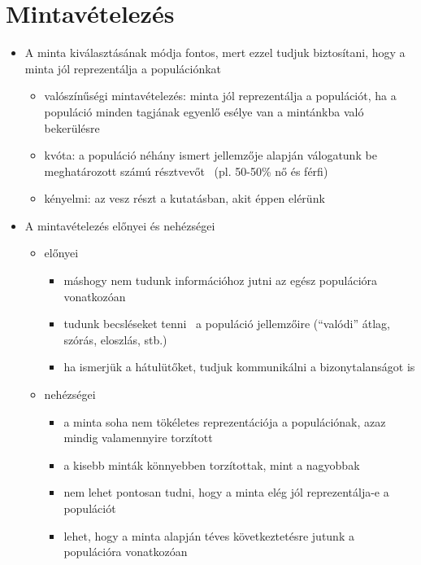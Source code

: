 \documentclass[
  letterpaper,
  DIV=11,
  numbers=noendperiod]{scrreprt}
\providecommand{\tightlist}{%
  \setlength{\itemsep}{0pt}\setlength{\parskip}{0pt}}\usepackage{longtable,booktabs,array}
\begin{document}
\hypertarget{mintavuxe9telezuxe9s}{%
\section{Mintavételezés}\label{mintavuxe9telezuxe9s}}

\begin{itemize}
\item
  A minta kiválasztásának módja fontos, mert ezzel tudjuk biztosítani,
  hogy a minta jól reprezentálja a populációnkat

  \begin{itemize}
  \tightlist
  \item
    valószínűségi mintavételezés: minta jól reprezentálja a populációt,
    ha a populáció minden tagjának egyenlő esélye van a mintánkba való
    bekerülésre
  \item
    kvóta: a populáció néhány ismert jellemzője alapján válogatunk be
    meghatározott számú résztvevőt~ (pl. 50-50\% nő és férfi)
  \item
    kényelmi: az vesz részt a kutatásban, akit éppen elérünk
  \end{itemize}
\item
  A mintavételezés előnyei és nehézségei

  \begin{itemize}
  \item
    előnyei

    \begin{itemize}
    \item
      máshogy nem tudunk információhoz jutni az egész populációra
      vonatkozóan
    \item
      tudunk becsléseket tenni~ a populáció jellemzőire (``valódi''
      átlag, szórás, eloszlás, stb.)
    \item
      ha ismerjük a hátulütőket, tudjuk kommunikálni a bizonytalanságot
      is
    \end{itemize}
  \item
    nehézségei

    \begin{itemize}
    \item
      a minta soha nem tökéletes reprezentációja a populációnak, azaz
      mindig valamennyire torzított
    \item
      a kisebb minták könnyebben torzítottak, mint a nagyobbak
    \item
      nem lehet pontosan tudni, hogy a minta elég jól reprezentálja-e a
      populációt
    \item
      lehet, hogy a minta alapján téves következtetésre jutunk a
      populációra vonatkozóan
    \end{itemize}
  \end{itemize}
\end{itemize}
\end{document}
